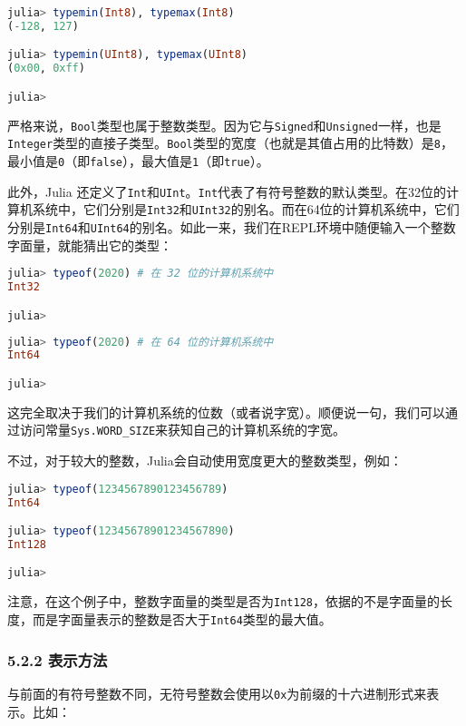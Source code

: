 \begin{lstlisting}[language=julia]
julia> typemin(Int8), typemax(Int8)
(-128, 127)

julia> typemin(UInt8), typemax(UInt8)
(0x00, 0xff)

julia> 
\end{lstlisting}

严格来说，\verb`Bool`类型也属于整数类型。因为它与\verb`Signed`和\verb`Unsigned`一样，也是\verb`Integer`类型的直接子类型。\verb`Bool`类型的宽度（也就是其值占用的比特数）是\verb`8`，最小值是\verb`0`（即\verb`false`），最大值是\verb`1`（即\verb`true`）。

此外，Julia 还定义了\verb`Int`和\verb`UInt`。\verb`Int`代表了有符号整数的默认类型。在32位的计算机系统中，它们分别是\verb`Int32`和\verb`UInt32`的别名。而在64位的计算机系统中，它们分别是\verb`Int64`和\verb`UInt64`的别名。如此一来，我们在REPL环境中随便输入一个整数字面量，就能猜出它的类型：

\begin{lstlisting}[language=julia]
julia> typeof(2020) # 在 32 位的计算机系统中 
Int32 

julia> 
\end{lstlisting}

\begin{lstlisting}[language=julia]
julia> typeof(2020) # 在 64 位的计算机系统中 
Int64

julia> 
\end{lstlisting}

这完全取决于我们的计算机系统的位数（或者说字宽）。顺便说一句，我们可以通过访问常量\verb`Sys.WORD_SIZE`来获知自己的计算机系统的字宽。

不过，对于较大的整数，Julia会自动使用宽度更大的整数类型，例如：

\begin{lstlisting}[language=julia]
julia> typeof(1234567890123456789)
Int64

julia> typeof(12345678901234567890)
Int128

julia> 
\end{lstlisting}

注意，在这个例子中，整数字面量的类型是否为\verb`Int128`，依据的不是字面量的长度，而是字面量表示的整数是否大于\verb`Int64`类型的最大值。

\subsubsection{5.2.2 表示方法}

与前面的有符号整数不同，无符号整数会使用以\verb`0x`为前缀的十六进制形式来表示。比如：


